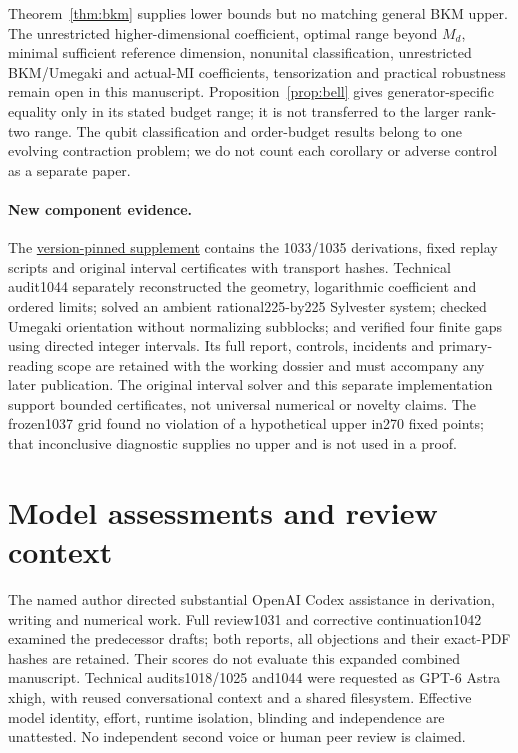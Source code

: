 Theorem~\ref{thm:bkm} supplies lower bounds but no matching general BKM upper. The unrestricted higher-dimensional coefficient, optimal range beyond \(M_d\), minimal sufficient reference dimension, nonunital classification, unrestricted BKM/Umegaki and actual-MI coefficients, tensorization and practical robustness remain open in this manuscript. Proposition~\ref{prop:bell} gives generator-specific equality only in its stated budget range; it is not transferred to the larger rank-two range. The qubit classification and order-budget results belong to one evolving contraction problem; we do not count each corollary or adverse control as a separate paper.

\paragraph{New component evidence.}
The \href{https://github.com/lluiseriksson/physmath-knowledge-tree/tree/34400956487e21509b5196884caa320907b26f58/integrations/research-radar/evidence/2026-10-27-principal-bkm}{version-pinned supplement} contains the 1033/1035 derivations, fixed replay scripts and original interval certificates with transport hashes. Technical audit1044 separately reconstructed the geometry, logarithmic coefficient and ordered limits; solved an ambient rational225-by225 Sylvester system; checked Umegaki orientation without normalizing subblocks; and verified four finite gaps using directed integer intervals. Its full report, controls, incidents and primary-reading scope are retained with the working dossier and must accompany any later publication. The original interval solver and this separate implementation support bounded certificates, not universal numerical or novelty claims. The frozen1037 grid found no violation of a hypothetical upper in270 fixed points; that inconclusive diagnostic supplies no upper and is not used in a proof.

\section{Model assessments and review context}\label{sec:assessment}
The named author directed substantial OpenAI Codex assistance in derivation, writing and numerical work. Full review1031 and corrective continuation1042 examined the predecessor drafts; both reports, all objections and their exact-PDF hashes are retained. Their scores do not evaluate this expanded combined manuscript. Technical audits1018/1025 and1044 were requested as GPT-6 Astra xhigh, with reused conversational context and a shared filesystem. Effective model identity, effort, runtime isolation, blinding and independence are unattested. No independent second voice or human peer review is claimed.

